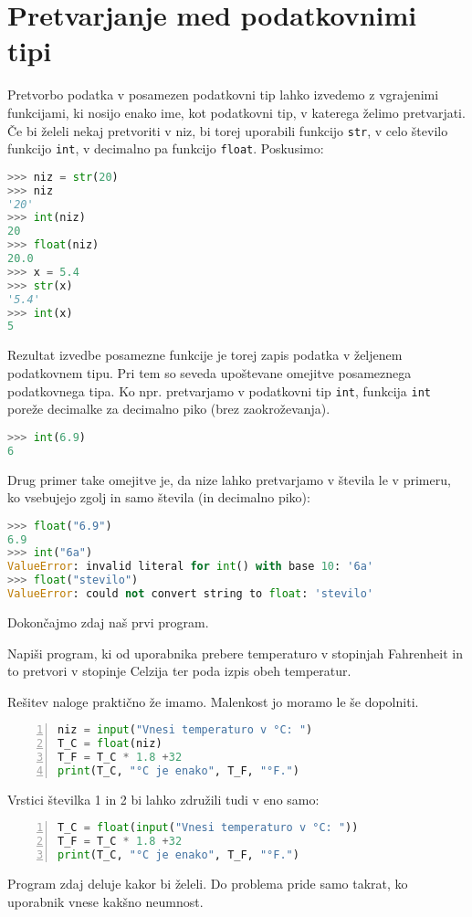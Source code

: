 \section{Pretvarjanje med podatkovnimi tipi}
Pretvorbo podatka v posamezen podatkovni tip lahko izvedemo z vgrajenimi funkcijami, ki nosijo enako ime, kot podatkovni tip, v katerega želimo pretvarjati. Če bi želeli nekaj pretvoriti v niz, bi torej uporabili funkcijo \texttt{str}, v celo število funkcijo \texttt{int}, v decimalno pa funkcijo \texttt{float}. Poskusimo:
\begin{lstlisting}[language=Python]
>>> niz = str(20)
>>> niz
'20'
>>> int(niz)
20
>>> float(niz)
20.0
>>> x = 5.4
>>> str(x)
'5.4'
>>> int(x)
5
\end{lstlisting}
Rezultat izvedbe posamezne funkcije je torej zapis podatka v željenem podatkovnem tipu. Pri tem so seveda upoštevane omejitve posameznega podatkovnega tipa. Ko npr. pretvarjamo v podatkovni tip \texttt{int}, funkcija \texttt{int} poreže decimalke za decimalno piko (brez zaokroževanja). 
\begin{lstlisting}[language=Python]
>>> int(6.9)
6
\end{lstlisting}
Drug primer take omejitve je, da nize lahko pretvarjamo v števila le v primeru, ko vsebujejo zgolj in samo števila (in decimalno piko):
\begin{lstlisting}[language=Python]
>>> float("6.9")
6.9
>>> int("6a")
ValueError: invalid literal for int() with base 10: '6a'
>>> float("stevilo")
ValueError: could not convert string to float: 'stevilo'
\end{lstlisting}

Dokončajmo zdaj naš prvi program.
\begin{zgled}
Napiši program, ki od uporabnika prebere temperaturo v stopinjah Fahrenheit in to pretvori v stopinje Celzija ter poda izpis obeh temperatur.
\end{zgled}
\begin{resitev}
Rešitev naloge praktično že imamo. Malenkost jo moramo le še dopolniti.
\begin{lstlisting}[language=Python,numbers=left]
niz = input("Vnesi temperaturo v °C: ")
T_C = float(niz)
T_F = T_C * 1.8 +32
print(T_C, "°C je enako", T_F, "°F.")
\end{lstlisting}
Vrstici številka 1 in 2 bi lahko združili tudi v eno samo:
\begin{lstlisting}[language=Python,numbers=left]
T_C = float(input("Vnesi temperaturo v °C: "))
T_F = T_C * 1.8 +32
print(T_C, "°C je enako", T_F, "°F.")
\end{lstlisting}
\end{resitev}
Program zdaj deluje kakor bi želeli. Do problema pride samo takrat, ko uporabnik vnese kakšno neumnost.


